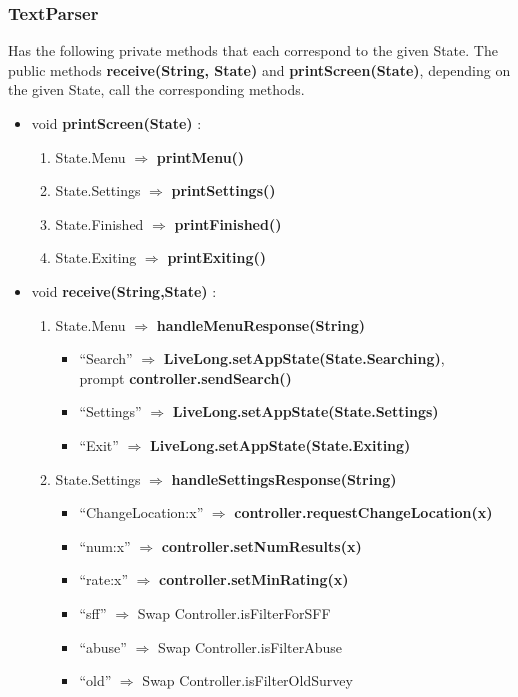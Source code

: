 \documentclass[12pt]{article}
\begin{document}
\subsubsection{TextParser}
Has the following private methods that each correspond to the given State. The public methods \textbf{receive(String, State)} and \textbf{ printScreen(State)}, depending on the given State, call the corresponding methods.
\begin{itemize}
\item void \textbf{printScreen(State)} :
\begin{enumerate}
	\item State.Menu $\Rightarrow$ \textbf{printMenu()}
	\item State.Settings $\Rightarrow$ \textbf{printSettings()}
	\item State.Finished $\Rightarrow$ \textbf{printFinished()}
	\item State.Exiting $\Rightarrow$ \textbf{printExiting()}
\end{enumerate}
\item void \textbf{receive(String,State)} :
\begin{enumerate}
	\item State.Menu $\Rightarrow$ \textbf{handleMenuResponse(String)} 
		\begin{itemize}
		\item ``Search'' $\Rightarrow$ \textbf{LiveLong.setAppState(State.Searching)}, \\ prompt \textbf{controller.sendSearch()}
		\item ``Settings'' $\Rightarrow$ \textbf{LiveLong.setAppState(State.Settings)}
		\item ``Exit'' $\Rightarrow$ \textbf{LiveLong.setAppState(State.Exiting)}
		\end{itemize}
	\item State.Settings $\Rightarrow$ \textbf{handleSettingsResponse(String)}
		\begin{itemize}
		\item ``ChangeLocation:x'' $\Rightarrow$ \textbf{controller.requestChangeLocation(x)}
		\item ``num:x'' $\Rightarrow$ \textbf{controller.setNumResults(x)}
		\item ``rate:x'' $\Rightarrow$ \textbf{controller.setMinRating(x)}
		\item ``sff'' $\Rightarrow$ Swap Controller.isFilterForSFF
		\item ``abuse'' $\Rightarrow$ Swap Controller.isFilterAbuse
		\item ``old'' $\Rightarrow$ Swap Controller.isFilterOldSurvey

\end{itemize}
\end{enumerate}
\end{itemize}
\end{document}
